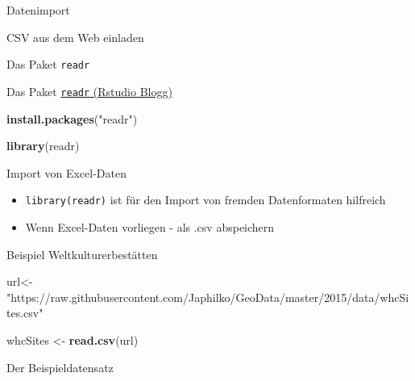 \documentclass[ignorenonframetext,]{beamer}
\newenvironment{Shaded}{}{}
\newcommand{\KeywordTok}[1]{\textcolor[rgb]{0.00,0.44,0.13}{\textbf{{#1}}}}
\newcommand{\StringTok}[1]{\textcolor[rgb]{0.25,0.44,0.63}{{#1}}}
\newcommand{\NormalTok}[1]{{#1}}
\providecommand{\tightlist}{%
\setlength{\itemsep}{0pt}\setlength{\parskip}{0pt}}
\begin{document}
\begin{frame}[fragile]{Datenimport}
\begin{block}{CSV aus dem Web einladen}
\end{block}

\begin{block}{Das Paket \texttt{readr}}

\begin{block}{Das Paket
\href{https://blog.rstudio.org/2015/10/28/readr-0-2-0/}{\texttt{readr}
(Rstudio Blogg)}}

\begin{Shaded}
\begin{Highlighting}[]
\KeywordTok{install.packages}\NormalTok{(}\StringTok{"readr"}\NormalTok{)}
\end{Highlighting}
\end{Shaded}

\begin{Shaded}
\begin{Highlighting}[]
\KeywordTok{library}\NormalTok{(readr)}
\end{Highlighting}
\end{Shaded}

\end{block}

\end{block}

\begin{block}{Import von Excel-Daten}

\begin{itemize}
\tightlist
\item
  \texttt{library(readr)} ist für den Import von fremden Datenformaten
  hilfreich
\item
  Wenn Excel-Daten vorliegen - als .csv abspeichern
\end{itemize}

\begin{block}{Beispiel Weltkulturerbestätten}

\begin{Shaded}
\begin{Highlighting}[]
\NormalTok{url<-}\StringTok{"https://raw.githubusercontent.com/Japhilko/GeoData/master/2015/data/whcSites.csv"}

\NormalTok{whcSites <-}\StringTok{ }\KeywordTok{read.csv}\NormalTok{(url) }
\end{Highlighting}
\end{Shaded}

\end{block}

\end{block}

\begin{block}{Der Beispieldatensatz}


\end{block}
\end{frame}
\end{document}
